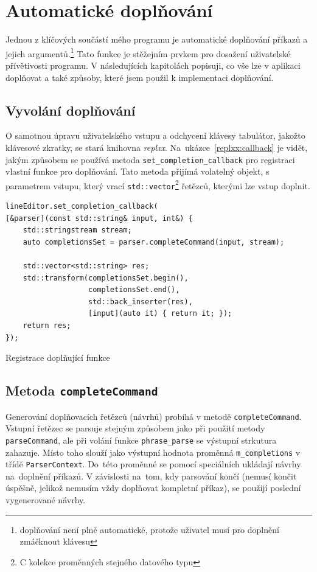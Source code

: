 \documentclass[thesis=B,czech,hidelinks]{FITthesis}[2019/03/06]
\newcommand{\Rplus}{\protect\hspace{-.1em}\protect\raisebox{.35ex}{\smaller{\smaller\textbf{+}}}}
\newcommand{\Cpp}{\mbox{C\Rplus\Rplus}\xspace}
\begin{document}
\section{Automatické doplňování}\label{completion}
Jednou z klíčových součástí mého programu je automatické doplňování příkazů a jejich argumentů.\footnote{doplňování není plně automatické, protože uživatel musí pro doplnění zmáčknout klávesu} Tato funkce je stěžejním prvkem pro dosažení uživatelské přívětivosti programu. V následujících kapitolách popisuji, co vše lze v aplikaci doplňovat a také způsoby, které jsem použil k implementaci doplňování.

\subsection{Vyvolání doplňování}
O samotnou úpravu uživatelského vstupu a odchycení klávesy tabulátor, jakožto klávesové zkratky, se stará knihovna \textit{replxx}. Na~ukázce~\ref{replxx:callback} je vidět, jakým způsobem se používá metoda \texttt{set\_completion\_callback} pro registraci vlastní funkce pro doplňování. Tato metoda přijímá volatelný objekt, s parametrem vstupu, který vrací \texttt{std::vector}\footnote{\Cpp{} kolekce proměnných stejného datového typu} řetězců, kterými lze vstup doplnit.

\begin{listing}[H]
\begin{verbatim}
lineEditor.set_completion_callback(
[&parser](const std::string& input, int&) {
    std::stringstream stream;
    auto completionsSet = parser.completeCommand(input, stream);

    std::vector<std::string> res;
    std::transform(completionsSet.begin(),
                   completionsSet.end(),
                   std::back_inserter(res),
                   [input](auto it) { return it; });
    return res;
});
\end{verbatim}
\caption{Registrace doplňující funkce}\label{replxx:callback}
\end{listing}

\subsection{Metoda \texttt{completeCommand}}
Generování doplňovacích řetězců (návrhů) probíhá v metodě \texttt{completeCommand}. Vstupní řetězec se parsuje stejným způsobem jako při použití metody \texttt{parseCommand}, ale při volání funkce \texttt{phrase\_parse} se výstupní strkutura zahazuje. Místo toho slouží jako výstupní hodnota proměnná \texttt{m\_completions} v třídě \texttt{ParserContext}. Do~této proměnné se pomocí speciálních  ukládají návrhy na~doplnění příkazů. V závislosti na~tom, kdy parsování končí (nemusí končit úspěšně, jelikož nemusím vždy doplňovat kompletní příkaz), se použijí poslední vygenerované návrhy.
\end{document}
